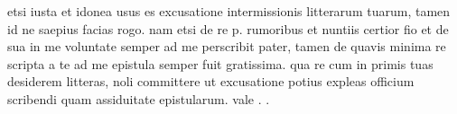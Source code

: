 


etsi iusta et idonea usus es excusatione intermissionis litterarum tuarum, tamen id ne saepius facias rogo. nam etsi de re p. rumoribus et nuntiis certior fio et de sua in me voluntate semper ad me perscribit pater, tamen de quavis minima re scripta a te ad me epistula semper fuit gratissima. qua re cum in primis tuas desiderem litteras, noli committere ut excusatione potius expleas officium scribendi quam assiduitate epistularum. vale .            .
